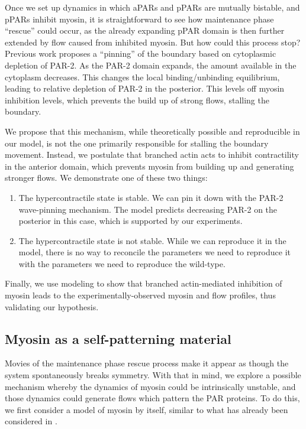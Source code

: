 \documentclass[11pt]{article}
\newcommand{\red}[1]{\color{red}#1\normalcolor}
\newcommand{\6}[1]{#1_{\text{6}}}
\newcommand{\3}[1]{#1_{\text{3}}}
\begin{document}
Once we set up dynamics in which aPARs and pPARs are mutually bistable, and pPARs inhibit myosin, it is straightforward to see how maintenance phase ``rescue'' could occur, as the already expanding pPAR domain is then further extended by flow caused from inhibited myosin. But how could this process stop? Previous work \cite{goehring2011polarization} proposes a ``pinning'' of the boundary \cite{mori2008wave} based on cytoplasmic depletion of PAR-2. As the PAR-2 domain expands, the amount available in the cytoplasm decreases. This changes the local binding/unbinding equilibrium, leading to relative depletion of PAR-2 in the posterior. This levels off myosin inhibition levels, which prevents the build up of strong flows, stalling the boundary.

We propose that this mechanism, while theoretically possible and reproducible in our model, is not the one primarily responsible for stalling the boundary movement. Instead, we postulate that branched actin acts to inhibit contractility in the anterior domain, which prevents myosin from building up and generating stronger flows. We demonstrate \red{one of these two things}:
\begin{enumerate}
\item The hypercontractile state is stable. We can pin it down with the PAR-2 wave-pinning mechanism. The model predicts decreasing PAR-2 on the posterior in this case, which is supported by our experiments. 
\item The hypercontractile state is not stable. While we can reproduce it in the model, there is no way to reconcile the parameters we need to reproduce it with the parameters we need to reproduce the wild-type. 
\end{enumerate}
Finally, we use modeling to show that branched actin-mediated inhibition of myosin leads to the experimentally-observed myosin and flow profiles, thus validating our hypothesis. 

\subsection{Myosin as a self-patterning material} 
Movies of the maintenance phase rescue process make it appear as though the system spontaneously breaks symmetry. With that in mind, we explore a possible mechanism whereby the dynamics of myosin could be intrinsically unstable, and those dynamics could generate flows which pattern the PAR proteins. To do this, we first consider a model of myosin by itself, similar to what has already been considered in \cite{bois2011pattern}. 
\end{document}

